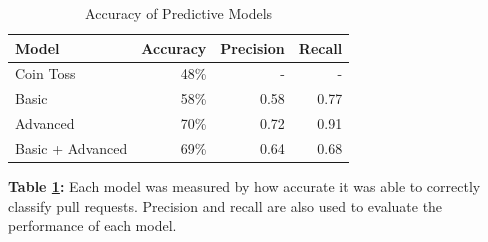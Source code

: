 \documentclass[10pt, conference]{IEEEtran}
\begin{document}
\begin{table}[h!]
  \centering
  \caption{Accuracy of Predictive Models}
  \label{figurePredictionModels}
  \begin{tabular}{lrrr}
    \toprule
    \textbf {Model} & \textbf{Accuracy} & \textbf{Precision} & \textbf{Recall}\\ %
    \midrule
    Coin Toss & 48\% & - & - \\ %
    Basic & 58\% & 0.58 & 0.77\\ %
    Advanced & 70\% & 0.72 & 0.91\\ %
    Basic + Advanced & 69\% & 0.64 & 0.68\\ %
    \bottomrule
  \end{tabular}
  \break
  \break
\textbf{Table \ref{figurePredictionModels}:} Each model was measured by how accurate it was able to correctly classify pull requests. Precision and recall are also used to evaluate the performance of each model.
\end{table}
\end{document}
